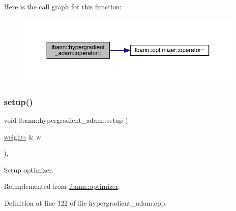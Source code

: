 Here is the call graph for this function\+:\nopagebreak
\begin{figure}[H]
\begin{center}
\leavevmode
\includegraphics[width=350pt]{classlbann_1_1hypergradient__adam_aab8df6bbd256c9731dc1e5b8eac286ec_cgraph}
\end{center}
\end{figure}
\mbox{\label{classlbann_1_1hypergradient__adam_acbc4aa4410eb2e7cb2fd9f423c4909dc}} 
\subsubsection{\texorpdfstring{setup()}{setup()}}
{\footnotesize\ttfamily void lbann\+::hypergradient\+\_\+adam\+::setup (\begin{DoxyParamCaption}\item[{\hyperlink{classlbann_1_1weights}{weights} \&}]{w }\end{DoxyParamCaption})\hspace{0.3cm}{\ttfamily [override]}, {\ttfamily [virtual]}}

Setup optimizer. 

Reimplemented from \hyperlink{classlbann_1_1optimizer_a7641a88b3c166df2d974a298622b992b}{lbann\+::optimizer}.



Definition at line 122 of file hypergradient\+\_\+adam.\+cpp.


